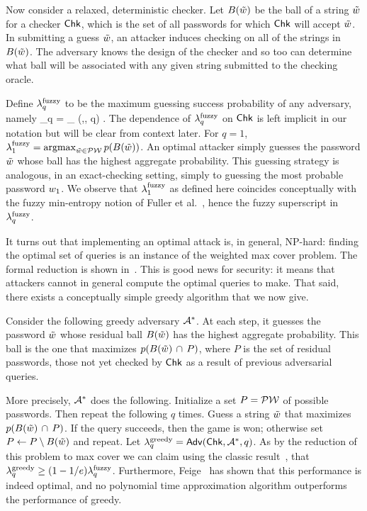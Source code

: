 Now consider a relaxed, deterministic checker. Let $B(\tilde{w})$ be
the ball of a string $\tilde{w}$ for a checker $\textnormal{\textsf{Chk}}$, which is the
set of all passwords for which $\textnormal{\textsf{Chk}}$ will accept $\tilde{w}$. In
submitting a guess $\tilde{w}$, an attacker induces checking on all of
the strings in $B(\tilde{w})$.  The adversary knows the design of
the checker and so too can determine what ball will be associated with
any given string submitted to the checking oracle.  

Define $\lambda^\textnormal{fuzzy}_q$ to be the maximum guessing success probability of any
adversary, namely
\bnm
  \fuzzlambda_q = \max_{\advA} \; \advantage(\checker,\advA, q) \;.
\enm 
The dependence of $\lambda^\textnormal{fuzzy}_q$ on $\textnormal{\textsf{Chk}}$ is left
implicit in our notation but will be clear from context later. For $q=1$, 
$\lambda^\textnormal{fuzzy}_1 = \operatorname*{argmax}_{\tilde{w} \in \mathcal{PW}} p(B(\tilde{w}))$.
An optimal attacker simply guesses the
password $\tilde{w}$ whose ball has the highest aggregate probability.
This guessing strategy is analogous, in an exact-checking setting,
simply to guessing the most probable password ${w}_1$. We observe that
$\lambda^\textnormal{fuzzy}_1$ as defined here coincides conceptually with the fuzzy
min-entropy notion of Fuller et al.~\cite{fuller2014fuzzy}, hence 
the fuzzy superscript in $\lambda^\textnormal{fuzzy}_q$.

It turns out that implementing an optimal attack is, in general, NP-hard:
finding the optimal set of queries is an instance of the weighted max cover
problem. The formal reduction is shown in~. This is good news for security: it means that attackers cannot in general compute the optimal queries to make.  That said, there exists a
conceptually simple greedy algorithm that we now give.


Consider the following greedy adversary $\advA^*$. 
At each step, it guesses the password $\tilde{w}$ whose residual ball $B(\tilde{w})$ has the highest
aggregate probability. This ball is the one that maximizes
$p(B(\tilde{w}) \,\cap\, P)$, where $P$ is the set of residual
passwords, those not yet checked by $\textnormal{\textsf{Chk}}$ as a result of previous
adversarial queries. 

More precisely, $\advA^*$ does the following. Initialize a set
$P = \mathcal{PW}$ of possible passwords. Then repeat the following $q$
times. Guess a string $\tilde{w}$ that maximizes
$p(B(\tilde{w}) \,\cap\, P)$. If the query succeeds, then the
game is won; otherwise set $P \gets P \setminus B(\tilde{w})$ and
repeat. 
Let $\greedylambda_q = \advantage(\checker,\advA^*,q)$.  As by the
reduction of this problem to max cover we can claim using the classic
result~\cite{hochbaum1996approximating}, that
$\lambda^\textnormal{greedy}_q \ge (1-1/e)\lambda^\textnormal{fuzzy}_q$. Furthermore,
Feige~\cite{feige1998threshold} has shown that this performance is
indeed optimal, and no polynomial time approximation algorithm
outperforms the performance of greedy.


